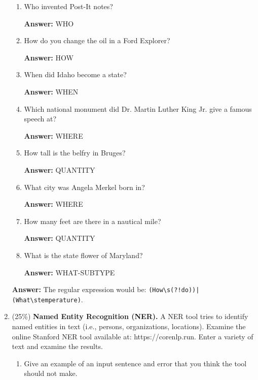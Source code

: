 \documentclass[11pt]{article}
\begin{document}
\begin{enumerate}
\begin{enumerate}
                  \item Who invented Post-It notes?

                        \textbf{Answer:} WHO

                  \item How do you change the oil in a Ford Explorer?

                        \textbf{Answer:} HOW

                  \item When did Idaho become a state?

                        \textbf{Answer:} WHEN

                  \item Which national monument did Dr. Martin Luther King Jr. give a famous speech at?

                        \textbf{Answer:} WHERE

                  \item How tall is the belfry in Bruges?

                        \textbf{Answer:} QUANTITY

                  \item What city was Angela Merkel born in?

                        \textbf{Answer:} WHERE

                  \item How many feet are there in a nautical mile?

                        \textbf{Answer:} QUANTITY

                  \item What is the state flower of Maryland?

                        \textbf{Answer:} WHAT-SUBTYPE

            \end{enumerate}

            \textbf{Answer:} The regular expression would be: \texttt{(How\textbackslash s(?!do))|(What\textbackslash stemperature)}.

      \item (25\%) \textbf{Named Entity Recognition (NER).} A NER tool tries to identify named entities in text (i.e., persons, organizations, locations). Examine the online Stanford NER tool available at: https://corenlp.run. Enter a variety of text and examine the results.
            \begin{enumerate}
                  \item Give an example of an input sentence and error that you think the tool should not make.


\end{enumerate}
\end{enumerate}
\end{document}
